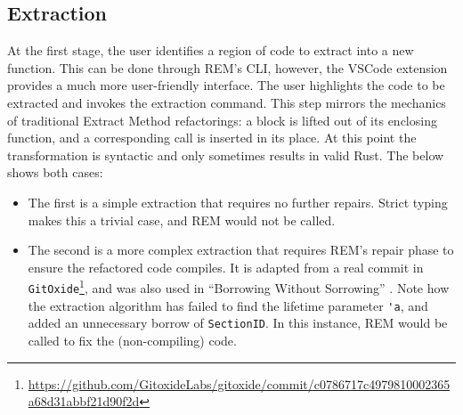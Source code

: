 \subsection{Extraction}


At the first stage, the user identifies a region of code to extract into a new
function. This can be done through REM's CLI, however, the VSCode extension
provides a much more user-friendly interface. The user highlights the code to be
extracted and invokes the extraction command. This step mirrors the mechanics of
traditional Extract Method refactorings: a block is lifted out of its enclosing
function, and a corresponding call is inserted in its place. At this point the
transformation is syntactic and only sometimes results in valid Rust. The below shows both cases:
\begin{itemize}
    \item The first is a simple extraction that requires no further repairs.
    Strict typing makes this a trivial case, and REM would not be called.
    \item The second is a more complex extraction that requires REM's repair
    phase to ensure the refactored code compiles. It is adapted from a real
    commit in \verb|GitOxide|\footnote{\url{https://github.com/GitoxideLabs/gitoxide/commit/c0786717c4979810002365a68d31abbf21d90f2d}},
    and was also used in ``Borrowing Without Sorrowing'' \cite{BorrowingWithoutSorrowing}.
    Note how the extraction algorithm has failed to find the lifetime parameter
    \verb|'a|, and added an unnecessary borrow of \verb|SectionID|. In this
    instance, REM would be called to fix the (non-compiling) code.
\end{itemize}

